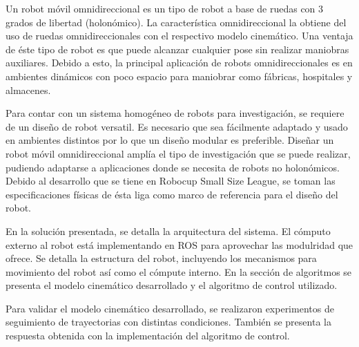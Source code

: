 \documentclass[twocolumn,10pt]{amrob}
\begin{document}
Un robot móvil omnidireccional es un tipo de robot a base de ruedas con 3 grados de libertad (holonómico). La característica omnidireccional la obtiene del uso de ruedas omnidireccionales con el respectivo modelo cinemático. Una ventaja de éste tipo de robot es que puede alcanzar cualquier pose sin realizar maniobras auxiliares. Debido a esto, la principal aplicación de robots omnidireccionales es en ambientes dinámicos con poco espacio para maniobrar como fábricas, hospitales y almacenes. \par
Para contar con un sistema homogéneo de robots para investigación, se requiere de un diseño de robot versatil. Es necesario que sea fácilmente adaptado y usado en ambientes distintos por lo que un diseño modular es preferible. Diseñar un robot móvil omnidireccional amplía el tipo de investigación que se puede realizar, pudiendo adaptarse a aplicaciones donde se necesita de robots no holonómicos. Debido al desarrollo que se tiene en Robocup Small Size League, se toman las especificaciones físicas de ésta liga como marco de referencia para el diseño del robot. \par
En la solución presentada, se detalla la arquitectura del sistema. El cómputo externo al robot está implementando en ROS para aprovechar las modulridad que ofrece. Se detalla la estructura del robot, incluyendo los mecanismos para movimiento del robot así como el cómpute interno. En la sección de algoritmos se presenta el modelo cinemático desarrollado y el algoritmo de control utilizado. \par
Para validar el modelo cinemático desarrollado, se realizaron experimentos de seguimiento de trayectorias con distintas condiciones. También se presenta la respuesta obtenida con la implementación del algoritmo de control. \par



\end{document}
